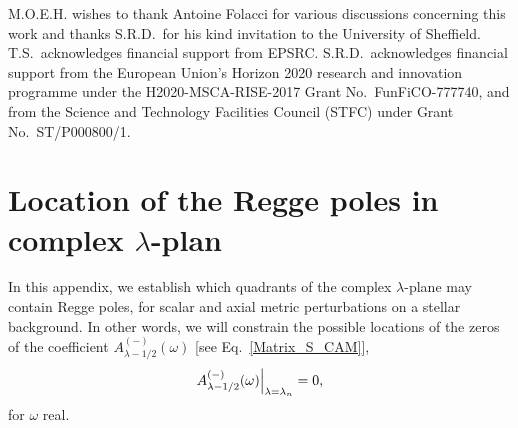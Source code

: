 \documentclass[aps,prd,longbibliography,reprint,twocolumn,amsmath,amssymb,amsfonts,showpacs,footnote,superscriptaddress]{revtex4-1}%
\newcommand{\tom}[1]{\textcolor{blue}{(Tom: #1)}}
\newcommand{\moh}[1]{\textcolor{green}{(Mohamed: #1)}}
\begin{document}
\acknowledgments
M.O.E.H. wishes to thank Antoine Folacci for various discussions concerning this work and thanks S.R.D.~for his kind
invitation to the University of Sheffield. T.S.~acknowledges financial support from EPSRC. S.R.D.~acknowledges financial support from the European Union's Horizon 2020 research and innovation programme under the H2020-MSCA-RISE-2017 Grant No.~FunFiCO-777740, and from the Science and Technology Facilities Council (STFC) under Grant No.~ST/P000800/1.


\appendix

\section{Location of the Regge poles in complex $\lambda$-plan}
\label{appen}



In this appendix, we establish which quadrants of the complex $\lambda$-plane may contain Regge poles, for scalar and axial metric perturbations on a stellar background. In other words, we will constrain the possible locations of the zeros of the coefficient $A^{(-)}_{\lambda-1/2} (\omega)$ [see Eq.~\eqref{Matrix_S_CAM}],
\begin{equation}\label{zeros_Am}
   A^{(-)}_{\lambda-1/2} (\omega)\Big{|}_{\lambda =\lambda_n} = 0,
\end{equation}
for $\omega$ real.
\end{document}
